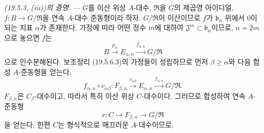 \begin{env}[19.5.6.8]
\label{0.19.5.6.8-fr}
\emph{(19.5.3, \emph{(iii)})의 증명}. --- $G$를 이산 위상
$A$-대수, $\mathfrak R$을 $G$의 제곱영 아이디얼,
$f:B\to G/\mathfrak R$을 연속 $A$-대수 준동형이라 하자.
$G/\mathfrak R$이 이산이므로 $f$가 $\mathfrak b_\alpha$ 위에서
$0$이 되는 지표 $\alpha$가 존재한다. 가정에 따라 어떤 정수 $m$에
대하여 $\mathfrak J^m\subset\mathfrak b_\alpha$이므로, $n=2m$으로
놓으면 $f$는
\[
  B\xrightarrow{p_\alpha}E_{\alpha,n}
  \xrightarrow{f_{\alpha,n}}G/\mathfrak R
\]
으로 인수분해된다. 보조정리 (19.5.6.3)의 가정들이 성립하므로 먼저
$\beta\geq\alpha$와 다음 합성 $A$-준동형을 얻는다.
\begin{equation}
\label{0.19.5.6.9-fr}
  f_{\alpha,n}\circ v_{\alpha\beta}:F_{\beta,n}
  \xrightarrow{v_{\alpha\beta}}E_{\alpha,n}
  \xrightarrow{f_{\alpha,n}}G/\mathfrak R.
  \tag{19.5.6.9}
\end{equation}
$F_{\beta,n}$은 $C_\beta$-대수이고, 따라서 특히 이산 위상
$C$-대수이다. 그러므로 합성하여 연속 $A$-준동형
\[
  r:C\longrightarrow F_{\beta,n}\longrightarrow G/\mathfrak R
\]
을 얻는다. 한편 $C$는 형식적으로 매끄러운 $A$-대수이므로,



\end{env}
